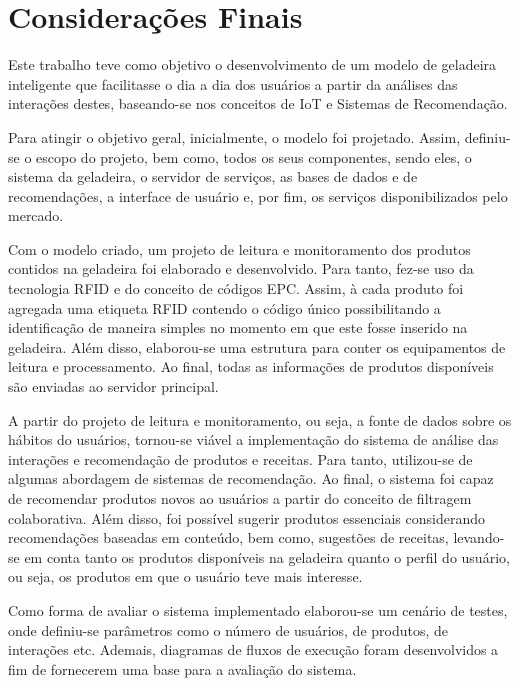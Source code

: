 \chapter{Considerações Finais}
\label{cap:consideracoes_finais}

Este trabalho teve como objetivo o desenvolvimento de um modelo de geladeira inteligente que facilitasse o dia a dia dos usuários a partir da análises das interações destes, baseando-se nos conceitos de IoT e Sistemas de Recomendação.

Para atingir o objetivo geral, inicialmente, o modelo foi projetado. Assim, definiu-se o escopo do projeto, bem como, todos os seus componentes, sendo eles, o sistema da geladeira, o servidor de serviços, as bases de dados e de recomendações, a interface de usuário e, por fim, os serviços disponibilizados pelo mercado.

Com o modelo criado, um projeto de leitura e monitoramento dos produtos contidos na geladeira foi elaborado e desenvolvido. Para tanto, fez-se uso da tecnologia RFID e do conceito de códigos EPC. Assim, à cada produto foi agregada uma etiqueta RFID contendo o código único possibilitando a identificação de maneira simples no momento em que este fosse inserido na geladeira. Além disso, elaborou-se uma estrutura para conter os equipamentos de leitura e processamento. Ao final, todas as informações de produtos disponíveis são enviadas ao servidor principal.

A partir do projeto de leitura e monitoramento, ou seja, a fonte de dados sobre os hábitos do usuários, tornou-se viável a implementação do sistema de análise das interações e recomendação de produtos e receitas. Para tanto, utilizou-se de algumas abordagem de sistemas de recomendação. Ao final, o sistema foi capaz de recomendar produtos novos ao usuários a partir do conceito de filtragem colaborativa. Além disso, foi possível sugerir produtos essenciais considerando recomendações baseadas em conteúdo, bem como, sugestões de receitas, levando-se em conta tanto os produtos disponíveis na geladeira quanto o perfil do usuário, ou seja, os produtos em que o usuário teve mais interesse.

Como forma de avaliar o sistema implementado elaborou-se um cenário de testes, onde definiu-se parâmetros como o número de usuários, de produtos, de interações etc. Ademais, diagramas de fluxos de execução foram desenvolvidos a fim de fornecerem uma base para a avaliação do sistema.

